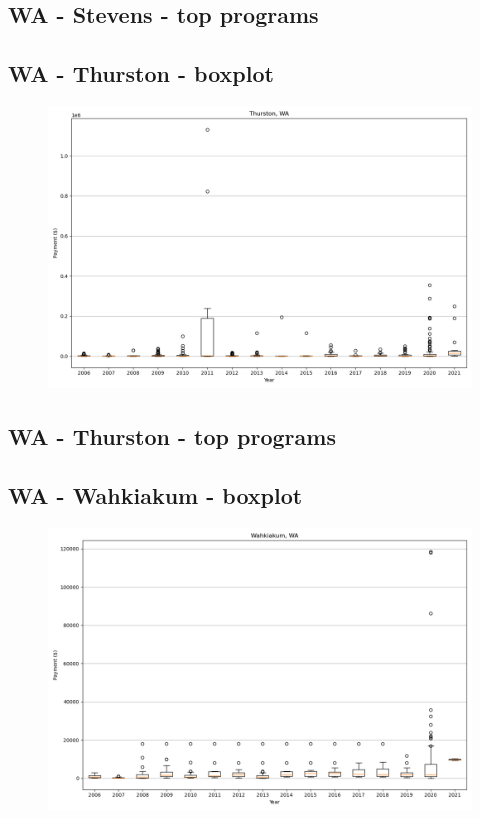 \subsection*{WA - Stevens - top programs}

\newpage
\subsection*{WA - Thurston - boxplot}
\begin{figure}[h]
\centering
\includegraphics[width=7in]{../output/boxplots/counties/Thurston-WA_boxplot.png}
\end{figure}


\subsection*{WA - Thurston - top programs}

\newpage
\subsection*{WA - Wahkiakum - boxplot}
\begin{figure}[h]
\centering
\includegraphics[width=7in]{../output/boxplots/counties/Wahkiakum-WA_boxplot.png}
\end{figure}


